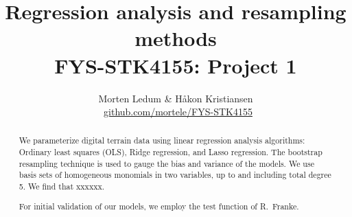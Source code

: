 \documentclass[a4paper]{article}
\title{{\sc Regression analysis and resampling methods \\ {\large FYS-STK4155: Project 1}}}
\author{Morten Ledum \& Håkon Kristiansen \\ \faGithub \ {\small \url{github.com/mortele/FYS-STK4155}}}
\begin{document}
\maketitle

\begin{abstract}
We parameterize digital terrain data using linear regression analysis algorithms: Ordinary least squares (OLS), Ridge regression, and Lasso regression. The bootstrap resampling technique is used to gauge the bias and variance of the models. We use basis sets of homogeneous monomials in two variables, up to and including total degree 5. We find that xxxxxx.

For initial validation of our models, we employ the test function of R.\ Franke\autocite{franke1979critical}.
\end{abstract}

\tableofcontents 
\newpage
\end{document}
